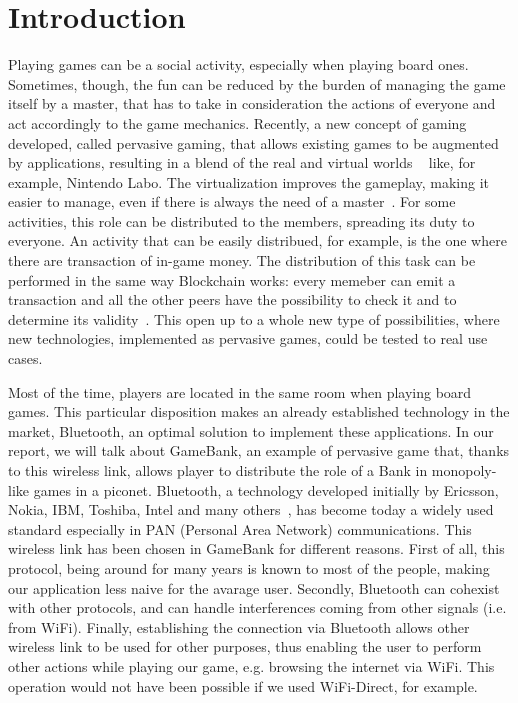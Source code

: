 \section{Introduction}

Playing games can be a social activity, especially when playing board ones. 
Sometimes, though, the fun can be reduced by the burden of managing the 
game itself by a master, that has to take in consideration the actions of 
everyone and act accordingly to the game mechanics. Recently, a new  concept of 
gaming developed, called pervasive gaming, that allows existing games to be 
augmented by applications, resulting in a blend of the real and virtual worlds 
~\cite{arango17} like, for example, Nintendo Labo.
The virtualization improves the gameplay, making it easier to manage, even if 
there is always the need of a master~\cite{bjork01}.
For some activities, this role can be distributed to the members, spreading its 
duty to everyone. An activity that can be easily distribued, for example, is the 
one where there are transaction of in-game money. The distribution of this task 
can be performed in the same way Blockchain works: every memeber can emit a 
transaction and all the other peers have the possibility to check it and to 
determine its validity~\cite{nakamoto08}. This open up to a whole new type of 
possibilities, where new technologies, implemented as pervasive games, could be 
tested to real use cases.

Most of the time, players are located in the same room when playing board 
games. This particular disposition makes an already established technology in 
the market, Bluetooth, an optimal solution to implement these applications. In 
our report, we will talk about GameBank, an example of pervasive game that, 
thanks to this wireless link, allows player to distribute the role of a Bank in 
monopoly-like games in a piconet.
Bluetooth, a technology developed initially by Ericsson, Nokia, IBM, Toshiba, 
Intel and many others~\cite{haartsen00}, has become today a widely used
standard especially in PAN (Personal Area Network) communications. This
wireless link has been chosen in GameBank for different reasons. First of all,
this protocol, being around for many years is known to most of the people,
making our application less naive for the avarage user. Secondly, Bluetooth can
cohexist with other protocols, and can handle interferences coming from other
signals (i.e. from WiFi). Finally, establishing the connection via Bluetooth
allows other wireless link to be used for other purposes, thus enabling the
user to perform other actions while playing our game, e.g. browsing the
internet via WiFi. This operation would not have been possible if we used 
WiFi-Direct, for example.\\

